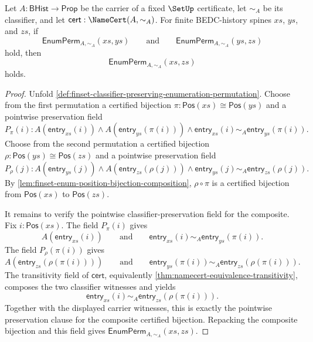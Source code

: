\begin{theorem}
\label{thm:enumperm-transitivity-by-bijection-composition}
Let $A:\mathsf{BHist}\to\mathsf{Prop}$ be the carrier of a fixed $\SetUp$ certificate, let $\sim_A$ be its classifier, and let $\mathsf{cert}:\NameCert(A,\sim_A)$. For finite BEDC-history spines $xs$, $ys$, and $zs$, if
$$
\mathsf{EnumPerm}_{A,\sim_A}(xs,ys)
\qquad\text{and}\qquad
\mathsf{EnumPerm}_{A,\sim_A}(ys,zs)
$$
hold, then
$$
\mathsf{EnumPerm}_{A,\sim_A}(xs,zs)
$$
holds.
\end{theorem}
\begin{proof}
Unfold \autoref{def:finset-classifier-preserving-enumeration-permutation}. Choose from the first permutation a certified bijection $\pi:\mathsf{Pos}(xs)\cong\mathsf{Pos}(ys)$ and a pointwise preservation field
$$
P_\pi(i):
A(\mathsf{entry}_{xs}(i))\land
A(\mathsf{entry}_{ys}(\pi(i)))\land
\mathsf{entry}_{xs}(i)\sim_A\mathsf{entry}_{ys}(\pi(i)).
$$
Choose from the second permutation a certified bijection $\rho:\mathsf{Pos}(ys)\cong\mathsf{Pos}(zs)$ and a pointwise preservation field
$$
P_\rho(j):
A(\mathsf{entry}_{ys}(j))\land
A(\mathsf{entry}_{zs}(\rho(j)))\land
\mathsf{entry}_{ys}(j)\sim_A\mathsf{entry}_{zs}(\rho(j)).
$$
By \autoref{lem:finset-enum-position-bijection-composition}, $\rho\circ\pi$ is a certified bijection from $\mathsf{Pos}(xs)$ to $\mathsf{Pos}(zs)$.

It remains to verify the pointwise classifier-preservation field for the composite. Fix $i:\mathsf{Pos}(xs)$. The field $P_\pi(i)$ gives
$$
A(\mathsf{entry}_{xs}(i))
\qquad\text{and}\qquad
\mathsf{entry}_{xs}(i)\sim_A\mathsf{entry}_{ys}(\pi(i)).
$$
The field $P_\rho(\pi(i))$ gives
$$
A(\mathsf{entry}_{zs}(\rho(\pi(i))))
\qquad\text{and}\qquad
\mathsf{entry}_{ys}(\pi(i))\sim_A\mathsf{entry}_{zs}(\rho(\pi(i))).
$$
The transitivity field of $\mathsf{cert}$, equivalently \autoref{thm:namecert-equivalence-transitivity}, composes the two classifier witnesses and yields
$$
\mathsf{entry}_{xs}(i)\sim_A\mathsf{entry}_{zs}(\rho(\pi(i))).
$$
Together with the displayed carrier witnesses, this is exactly the pointwise preservation clause for the composite certified bijection. Repacking the composite bijection and this field gives $\mathsf{EnumPerm}_{A,\sim_A}(xs,zs)$.
\end{proof}


